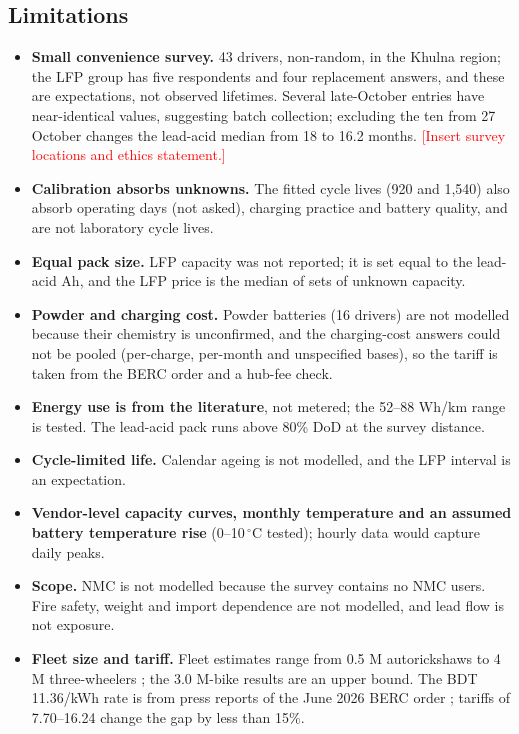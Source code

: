 \documentclass[11pt,a4paper]{article}
\newcommand{\todo}[1]{\textcolor{red}{#1}}%
\newcommand{\nSurvey}{43}
\newcommand{\replMedLA}{18}
\newcommand{\nPW}{16}
\newcommand{\replLAnobatch}{16.2}
\newcommand{\NcalLA}{920}
\newcommand{\NcalLFP}{1{,}540}
\begin{document}
\subsection{Limitations}
\label{sec:limits}
\begin{itemize}
\item \textbf{Small convenience survey.} \nSurvey{} drivers, non-random, in the Khulna region; the LFP group has five respondents and four replacement answers, and these are expectations, not observed lifetimes. Several late-October entries have near-identical values, suggesting batch collection; excluding the ten from 27 October changes the lead-acid median from \replMedLA{} to \replLAnobatch{} months. \todo{[Insert survey locations and ethics statement.]}
\item \textbf{Calibration absorbs unknowns.} The fitted cycle lives (\NcalLA{} and \NcalLFP{}) also absorb operating days (not asked), charging practice and battery quality, and are not laboratory cycle lives.
\item \textbf{Equal pack size.} LFP capacity was not reported; it is set equal to the lead-acid Ah, and the LFP price is the median of sets of unknown capacity.
\item \textbf{Powder and charging cost.} Powder batteries (\nPW{} drivers) are not modelled because their chemistry is unconfirmed, and the charging-cost answers could not be pooled (per-charge, per-month and unspecified bases), so the tariff is taken from the BERC order and a hub-fee check.
\item \textbf{Energy use is from the literature}, not metered; the 52--88 Wh/km range is tested. The lead-acid pack runs above 80\% DoD at the survey distance.
\item \textbf{Cycle-limited life.} Calendar ageing is not modelled, and the LFP interval is an expectation.
\item \textbf{Vendor-level capacity curves, monthly temperature and an assumed battery temperature rise} (0--10\,$^\circ$C tested); hourly data would capture daily peaks.
\item \textbf{Scope.} NMC is not modelled because the survey contains no NMC users. Fire safety, weight and import dependence are not modelled, and lead flow is not exposure.
\item \textbf{Fleet size and tariff.} Fleet estimates range from 0.5 M autorickshaws to 4 M three-wheelers \cite{clean2024,pureearth_smep,unctad_smep}; the 3.0 M-bike results are an upper bound. The BDT 11.36/kWh rate is from press reports of the June 2026 BERC order \cite{berc2026fe,fenews2026}; tariffs of 7.70--16.24 change the gap by less than 15\%.
\end{itemize}
\end{document}
